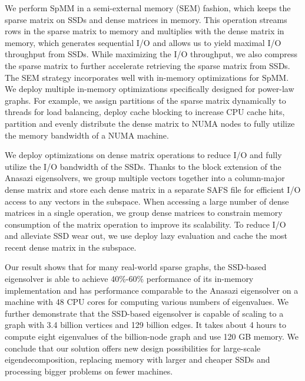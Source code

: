 We perform SpMM in a semi-external memory (SEM) fashion, which keeps
the sparse matrix on SSDs and dense matrices in memory. This operation streams
rows in the sparse matrix to memory and multiplies with the dense matrix in
memory, which generates sequential I/O and allows us to yield maximal I/O
throughput from SSDs. While maximizing the I/O throughput, we also compress
the sparse matrix to further accelerate retrieving the sparse matrix from SSDs.
The SEM strategy incorporates well with in-memory optimizations for SpMM.
We deploy multiple in-memory optimizations specifically designed for power-law
graphs. For example, we assign partitions of the sparse matrix dynamically to
threads for load balancing, deploy cache blocking to increase CPU cache hits,
partition and evenly distribute the dense matrix to NUMA nodes to fully utilize
the memory bandwidth of a NUMA machine.

We deploy optimizations on dense matrix operations to reduce I/O and fully
utilize the I/O bandwidth of the SSDs. Thanks to the block extension of
the Anasazi eigensolvers, we group multiple vectors together into a column-major
dense matrix and store each dense matrix in a separate SAFS file for efficient
I/O access to any vectors in the subspace. When accessing a large number of dense
matrices in a single operation, we group dense matrices to constrain memory
consumption of the matrix operation to improve its scalability. To reduce I/O
and alleviate SSD wear out, we use deploy lazy evaluation and cache the most
recent dense matrix in the subspace.


Our result shows that for many real-world sparse graphs, the SSD-based
eigensolver is able to achieve 40\%-60\%
performance of its in-memory implementation and has performance comparable to
the Anasazi eigensolver on a machine with 48 CPU cores for computing various
numbers of eigenvalues. We further demonstrate that the SSD-based eigensolver
is capable of scaling to a graph with 3.4 billion vertices and 129 billion edges.
It takes about 4 hours to compute eight eigenvalues of the billion-node graph
and use 120 GB memory. We conclude that our solution offers new design
possibilities for large-scale eigendecomposition, replacing memory with larger
and cheaper SSDs and processing bigger problems on fewer machines.
